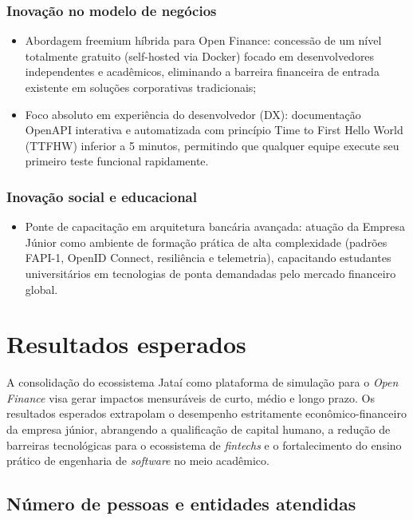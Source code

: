 \documentclass[
  12pt,
  openright,
  oneside,
  a4paper,
  brazilian
]{abntex2}
\begin{document}
\subsection{Inovação no modelo de negócios}
\begin{itemize}
    \item{Abordagem freemium híbrida para Open Finance:} concessão de um nível totalmente gratuito (self-hosted via Docker) focado em desenvolvedores independentes e acadêmicos, eliminando a barreira financeira de entrada existente em soluções corporativas tradicionais;
    \item{Foco absoluto em experiência do desenvolvedor (DX):} documentação OpenAPI interativa e automatizada com princípio Time to First Hello World (TTFHW) inferior a 5 minutos, permitindo que qualquer equipe execute seu primeiro teste funcional rapidamente.
\end{itemize}

\subsection{Inovação social e educacional}
\begin{itemize}
    \item{Ponte de capacitação em arquitetura bancária avançada:} atuação da Empresa Júnior como ambiente de formação prática de alta complexidade (padrões FAPI-1, OpenID Connect, resiliência e telemetria), capacitando estudantes universitários em tecnologias de ponta demandadas pelo mercado financeiro global.
\end{itemize}

\chapter{Resultados esperados}
\label{cap:resultados_esperados}

A consolidação do ecossistema Jataí como plataforma de simulação para o \textit{Open Finance} visa gerar impactos mensuráveis de curto, médio e longo prazo. Os resultados esperados extrapolam o desempenho estritamente econômico-financeiro da empresa júnior, abrangendo a qualificação de capital humano, a redução de barreiras tecnológicas para o ecossistema de \textit{fintechs} e o fortalecimento do ensino prático de engenharia de \textit{software} no meio acadêmico.

\section{Número de pessoas e entidades atendidas}
\label{sec:pessoas_atendidas}
\end{document}
